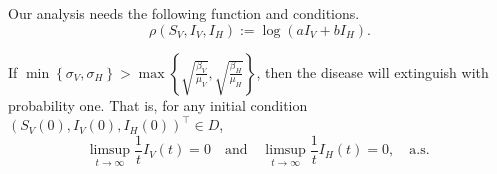 Our analysis needs the following function and conditions.
\begin{equation}
    \rho (S_V, I_V, I_H) := \log (a I_V + b I_H) .
\end{equation}

\begin{theorem}
        If 
        $
            \displaystyle
            \min
                \left \{
                      \sigma_V, \sigma_H 
                \right\} 
                > 
            \max 
                \left \{
                    \sqrt{\frac{\beta_V}{\mu_V}},
                    \sqrt{\frac{\beta_H}{\mu_H}}
                \right \}
        $,
        then the disease will extinguish with probability one.  That is,
        for any initial condition $(S_V(0), I_V(0), I_H(0)) ^{\top} \in 
        D$,
        $$
            \limsup_{t \to \infty} 
                \frac{1}{t} I_V(t) = 0 
                \quad \text{and} \quad
            \limsup_{t \to \infty} 
                \frac{1}{t} I_H(t) = 0, \quad 
                \text{
                   a.s.
                }
        $$
\end{theorem}        
